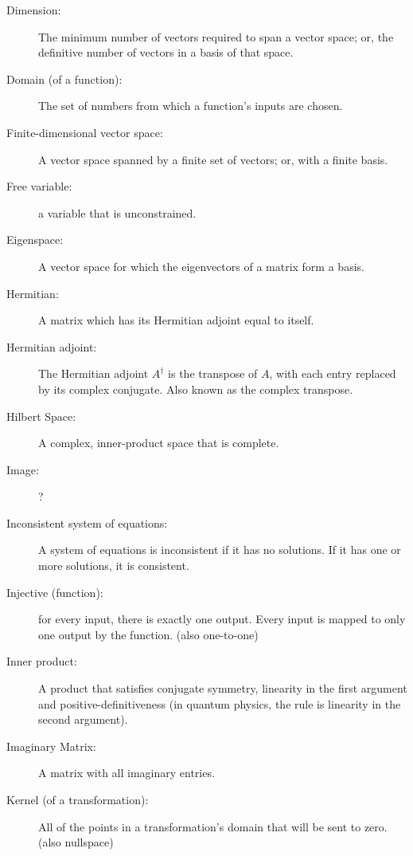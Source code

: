 \begin{description}
			\item[Dimension:] The minimum number of vectors required to span a vector space; or, the definitive number of vectors in a basis of that space.
			
			\item[Domain (of a function):] The set of numbers from which a function's inputs are chosen.
			
			\item[Finite-dimensional vector space:] A vector space spanned by a finite set of vectors; or, with a finite basis.
			
			\item[Free variable:] a variable that is unconstrained.
			
			\item[Eigenspace:] A vector space for which the eigenvectors of a matrix form a basis.
			
			\item[Hermitian:] A matrix which has its Hermitian adjoint equal to itself.
			
			\item[Hermitian adjoint:] The Hermitian adjoint $A^\dagger$ is the transpose of $A$, with each entry replaced by its complex conjugate. Also known as the complex transpose.
			
			\item[Hilbert Space:] A complex, inner-product space that is complete.
			
			\item[Image:] ?
			
			\item[Inconsistent system of equations:] A system of equations is inconsistent if it has no solutions. If it has one or more solutions, it is consistent.
			
			\item[Injective (function):] for every input, there is exactly one output. Every input is mapped to only one output by the function. (also one-to-one)
			
			\item[Inner product:] A product that satisfies conjugate symmetry, linearity in the first argument and positive-definitiveness (in quantum physics, the rule is linearity in the second argument).
			
			\item[Imaginary Matrix:] A matrix with all imaginary entries.
			
			\item[Kernel (of a transformation):] All of the points in a transformation's domain that will be sent to zero. (also nullspace)
			

\end{description}
